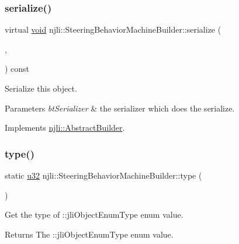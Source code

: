 \subsubsection{\texorpdfstring{serialize()}{serialize()}}
{\footnotesize\ttfamily virtual \mbox{\hyperlink{_thread_8h_af1e856da2e658414cb2456cb6f7ebc66}{void}} njli\+::\+Steering\+Behavior\+Machine\+Builder\+::serialize (\begin{DoxyParamCaption}\item[{\mbox{\hyperlink{_thread_8h_af1e856da2e658414cb2456cb6f7ebc66}{void}} $\ast$}]{,  }\item[{bt\+Serializer $\ast$}]{ }\end{DoxyParamCaption}) const\hspace{0.3cm}{\ttfamily [virtual]}}

Serialize this object.


\begin{DoxyParams}{Parameters}
{\em bt\+Serializer} & the serializer which does the serialize. \\
\hline
\end{DoxyParams}


Implements \mbox{\hyperlink{classnjli_1_1_abstract_builder_ab66b774e02ccb9da554c9aab7fa6d981}{njli\+::\+Abstract\+Builder}}.

\mbox{\label{classnjli_1_1_steering_behavior_machine_builder_ac68b89458678051ae996b1a006511425}} 
\subsubsection{\texorpdfstring{type()}{type()}}
{\footnotesize\ttfamily static \mbox{\hyperlink{_util_8h_a10e94b422ef0c20dcdec20d31a1f5049}{u32}} njli\+::\+Steering\+Behavior\+Machine\+Builder\+::type (\begin{DoxyParamCaption}{ }\end{DoxyParamCaption})\hspace{0.3cm}{\ttfamily [static]}}

Get the type of \+::jli\+Object\+Enum\+Type enum value.

\begin{DoxyReturn}{Returns}
The \+::jli\+Object\+Enum\+Type enum value. 
\end{DoxyReturn}


